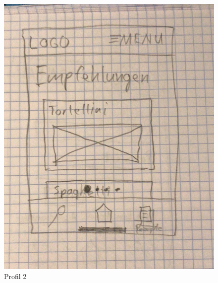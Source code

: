 \begin{figure}[H]
  \includegraphics[width=\linewidth]{./exercise13/Profil2.jpeg}
  \caption{Profil 2}
\end{figure}

